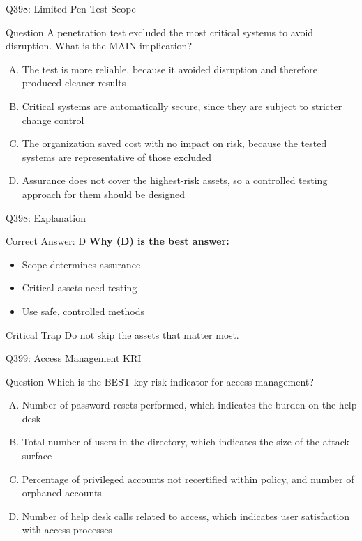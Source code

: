 \documentclass{beamer}
\begin{document}
	\begin{frame}{Q398: Limited Pen Test Scope}
		\begin{block}{Question}
			\small A penetration test excluded the most critical systems to avoid disruption. What is the MAIN implication?
		\end{block}
		\begin{enumerate}[(A)]
			\footnotesize
			\item The test is more reliable, because it avoided disruption and therefore produced cleaner results
			\item Critical systems are automatically secure, since they are subject to stricter change control
			\item The organization saved cost with no impact on risk, because the tested systems are representative of those excluded
			\item Assurance does not cover the highest-risk assets, so a controlled testing approach for them should be designed
		\end{enumerate}
	\end{frame}
	
	\begin{frame}{Q398: Explanation}
		\begin{block}{Correct Answer: D}
			\textbf{Why (D) is the best answer:}
			\begin{itemize}
				\item Scope determines assurance
				\item Critical assets need testing
				\item Use safe, controlled methods
			\end{itemize}
		\end{block}
		\begin{alertblock}{Critical Trap}
			Do not skip the assets that matter most.
		\end{alertblock}
	\end{frame}
	
	\begin{frame}{Q399: Access Management KRI}
		\begin{block}{Question}
			\small Which is the BEST key risk indicator for access management?
		\end{block}
		\begin{enumerate}[(A)]
			\footnotesize
			\item Number of password resets performed, which indicates the burden on the help desk
			\item Total number of users in the directory, which indicates the size of the attack surface
			\item Percentage of privileged accounts not recertified within policy, and number of orphaned accounts
			\item Number of help desk calls related to access, which indicates user satisfaction with access processes
		\end{enumerate}
	\end{frame}
	
\end{document}
